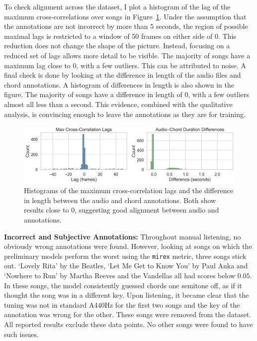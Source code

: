 To check alignment across the dataset, I plot a histogram of the lag of the maximum cross-correlations over songs in Figure~\ref{fig:durations-and-lags}. Under the assumption that the annotations are not incorrect by more than 5 seconds, the region of possible maximal lags is restricted to a window of 50 frames on either side of 0. This reduction does not change the shape of the picture. Instead, focusing on a reduced set of lags allows more detail to be visible. The majority of songs have a maximum lag close to 0, with a few outliers. This can be attributed to noise. A final check is done by looking at the difference in length of the audio files and chord annotations. A histogram of differences in length is also shown in the figure. The majority of songs have a difference in length of 0, with a few outliers almost all less than a second. This evidence, combined with the qualitative analysis, is convincing enough to leave the annotations as they are for training.

\begin{figure}[H]
    \centering
    \includegraphics[width=1.0\textwidth]{figures/duration_diffs_and_lags.png}
    \caption{Histograms of the maximum cross-correlation lags and the difference in length between the audio and chord annotations. Both show results close to $0$, suggesting good alignment between audio and annotations. }\label{fig:durations-and-lags}
\end{figure}

\textbf{Incorrect and Subjective Annotations:} Throughout manual listening, no obviously wrong annotations were found. However, looking at songs on which the preliminary models perform the worst using the \texttt{mirex} metric, three songs stick out. `Lovely Rita' by the Beatles, `Let Me Get to Know You' by Paul Anka and `Nowhere to Run' by Martha Reeves and the Vandellas all had scores below $0.05$. In these songs, the model consistently guessed chords one semitone off, as if it thought the song was in a different key. Upon listening, it became clear that the tuning was not in standard A440Hz for the first two songs and the key of the annotation was wrong for the other. These songs were removed from the dataset. All reported results exclude these data points. No other songs were found to have such issues.

